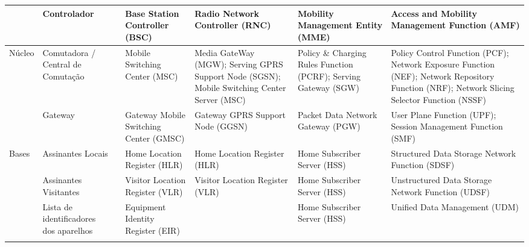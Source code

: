 \documentclass[11pt,oneside,a4paper]{abntex2}
\begin{document}
\begin{center}
\begin{longtable}{|m{1.5cm}|m{2.5cm}|l|m{2cm}|m{2cm}|m{2cm}|m{2cm}|}
                        & Controlador                            &    & Base Station Controller (BSC)            & Radio Network Controller (RNC)                                                              & Mobility Management Entity (MME)                                & Access and Mobility Management Function (AMF)                                                                                               \\ \hline
\multirow{2}{*}{Núcleo} & Comutadora / Central de Comutação      &    & Mobile Switching Center (MSC)            & Media GateWay (MGW); Serving GPRS Support Node (SGSN); Mobile Switching Center Server (MSC) & Policy \& Charging Rules Function (PCRF); Serving Gateway (SGW) & Policy Control Function (PCF); Network Exposure Function (NEF); Network Repository Function (NRF); Network Slicing Selector Function (NSSF) \\ \cline{2-7} 
                        & Gateway                                &    & Gateway Mobile Switching Center (GMSC)   & Gateway GPRS Support Node (GGSN)                                                            & Packet Data Network Gateway (PGW)                               & User Plane Function (UPF); Session Management Function (SMF)                                                                                \\ \hline
\multirow{4}{*}{Bases}  & Assinantes Locais                      &    & Home Location Register (HLR)             & Home Location Register (HLR)                                                                & Home Subscriber Server (HSS)                                    & Structured Data Storage Network Function (SDSF)                                                                                             \\ \cline{2-7} 
                        & Assinantes Visitantes                  &    & Visitor Location Register (VLR)          & Visitor Location Register (VLR)                                                             & Home Subscriber Server (HSS)                                    & Unstructured Data Storage Network Function (UDSF)                                                                                           \\ \cline{2-7} 
                        & Lista de identificadores dos aparelhos &    & Equipment Identity Register (EIR)        &                                                                                             & Home Subscriber Server (HSS)                                    & Unified Data Management (UDM)                                                                                                               \\ \cline{2-7} 

\end{longtable}
\end{center}
\end{document}
